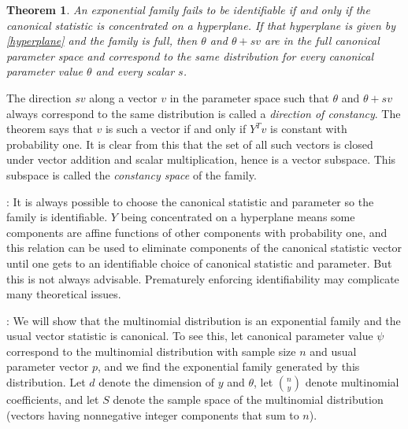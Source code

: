 \documentclass[12pt]{article}
\newtheorem{thm}{Theorem}
\begin{document}
\begin{thm}
An exponential family fails to be identifiable if and only if the canonical statistic is concentrated on a hyperplane. If that hyperplane is given by \eqref{hyperplane} and the family is full, then $\theta$ and $\theta+sv$ are in the full canonical parameter space and correspond to the same distribution for every canonical parameter value $\theta$ and every scalar $s$. 	
\end{thm}
 

The direction $sv$ along a vector $v$ in the parameter space such that $\theta$ and $\theta + sv$ always correspond to the same distribution is called a \emph{direction of constancy}. The theorem says that $v$ is such a vector if and only if $Y^Tv$ is constant with probability one. It is clear from this that the set of all such vectors is closed under vector addition and scalar multiplication, hence is a vector subspace. This subspace is called the \emph{constancy space} of the family. \vspace{0.5cm}

: It is always possible to choose the canonical statistic and parameter so the family is identifiable. $Y$ being concentrated on a hyperplane means some components are affine functions of other components with probability one, and this relation can be used to eliminate components of the canonical statistic vector until one gets to an identifiable choice of canonical statistic and parameter. But this is not always advisable. Prematurely enforcing identifiability may complicate many theoretical issues.




\vspace*{0.5cm}: We will show that the multinomial distribution is an exponential family and the usual vector statistic is canonical. To see this, let canonical parameter value $\psi$ correspond to the multinomial distribution with sample size $n$ and usual parameter vector $p$, and we find the exponential family generated by this distribution. Let $d$ denote the dimension of $y$ and $\theta$, let ${n \choose y}$ denote multinomial coefficients, and let $S$ denote the sample space of the multinomial distribution (vectors having nonnegative integer components that sum to $n$). 
\end{document}

